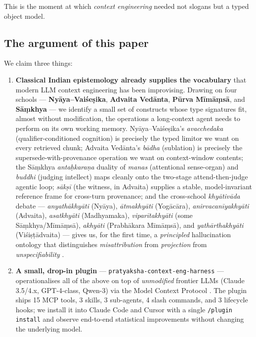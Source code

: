 This is the moment at which \emph{context engineering} needed not slogans but a typed object model.

\subsection{The argument of this paper}\label{the-argument-of-this-paper}

We claim three things:

\begin{enumerate}
\def\labelenumi{\arabic{enumi}.}
\item
  \textbf{Classical Indian epistemology already supplies the vocabulary} that modern LLM context engineering has been improvising. Drawing on four schools --- \textbf{Nyāya--Vaiśeṣika}, \textbf{Advaita Vedānta}, \textbf{Pūrva Mīmāṃsā}, and \textbf{Sāṃkhya} --- we identify a small set of constructs whose type signatures fit, almost without modification, the operations a long-context agent needs to perform on its own working memory. Nyāya--Vaiśeṣika's \emph{avacchedaka} (qualifier-conditioned cognition) is precisely the typed limitor we want on every retrieved chunk; Advaita Vedānta's \emph{bādha} (sublation) is precisely the supersede-with-provenance operation we want on context-window contents; the Sāṃkhya \emph{antaḥkaraṇa} duality of \emph{manas} (attentional sense-organ) and \emph{buddhi} (judging intellect) maps cleanly onto the two-stage attend-then-judge agentic loop; \emph{sākṣī} (the witness, in Advaita) supplies a stable, model-invariant reference frame for cross-turn provenance; and the cross-school \emph{khyātivāda} debate --- \emph{anyathākhyāti} (Nyāya), \emph{ātmakhyāti} (Yogācāra), \emph{anirvacanīyakhyāti} (Advaita), \emph{asatkhyāti} (Madhyamaka), \emph{viparītakhyāti} (some Sāṃkhya/Mīmāṃsā), \emph{akhyāti} (Prabhākara Mīmāṃsā), and \emph{yathārthakhyāti} (Viśiṣṭādvaita) --- gives us, for the first time, a \emph{principled} hallucination ontology that distinguishes \emph{misattribution} from \emph{projection} from \emph{unspecifiability} \citep{matilal1986perception, ganeri2001philosophy, phillips2012epistemology, ram2007error}.
\item
  \textbf{A small, drop-in plugin} --- \passthrough{\lstinline!pratyaksha-context-eng-harness!} --- operationalises all of the above on top of \emph{unmodified} frontier LLMs (Claude 3.5/4.x, GPT-4-class, Qwen-3) via the Model Context Protocol \citep{anthropic2025mcp}. The plugin ships 15 MCP tools, 3 skills, 3 sub-agents, 4 slash commands, and 3 lifecycle hooks; we install it into Claude Code and Cursor with a single \passthrough{\lstinline!/plugin install!} and observe end-to-end statistical improvements without changing the underlying model.

\end{enumerate}
